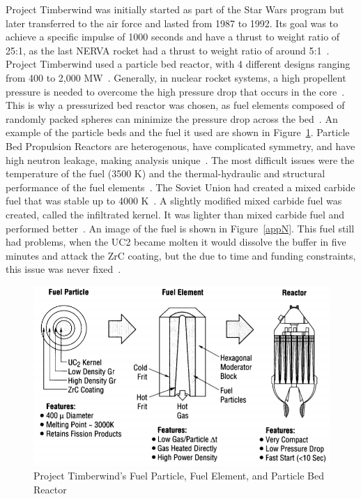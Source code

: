 \documentclass{article}
\begin{document}
Project Timberwind was initially started as part of the Star Wars program but later transferred to the air force and lasted from 1987 to 1992. Its goal was to achieve a specific impulse of 1000 seconds and have a thrust to weight ratio of 25:1, as the last NERVA rocket had a thrust to weight ratio of around 5:1~\cite{haslett1995space}. Project Timberwind used a particle bed reactor, with 4 different designs ranging from 400 to 2,000 MW~\cite{ludewig1996design}. Generally, in nuclear rocket systems, a high propellent pressure is needed to overcome the high pressure drop that occurs in the core~\cite{ludewig1996design}. This is why a pressurized bed reactor was chosen, as fuel elements composed of randomly packed spheres can minimize the pressure drop across the bed~\cite{ludewig1996design}. An example of the particle beds and the fuel it used are shown in Figure~\ref{appM}. Particle Bed Propulsion Reactors are heterogenous, have complicated symmetry, and have high neutron leakage, making analysis unique~\cite{ludewig1996design}. The most difficult issues were the temperature of the fuel (3500 K) and the thermal-hydraulic and structural performance of the fuel elements~\cite{haslett1995space}. The Soviet Union had created a mixed carbide fuel that was stable up to 4000 K~\cite{haslett1995space}. A slightly modified mixed carbide fuel was created, called the infiltrated kernel. It was lighter than mixed carbide fuel and performed better~\cite{haslett1995space}. An image of the fuel is shown in Figure~\ref{appN}. This fuel still had problems, when the UC2 became molten it would dissolve the buffer in five minutes and attack the ZrC coating, but the due to time and funding constraints, this issue was never fixed~\cite{haslett1995space}.


\begin{figure}[]
	\centering
	\includegraphics[height=0.45\textheight]{fig/appM}
	\caption[Project Timberwind's Fuel Particle, Fuel Element, and Particle Bed Reactor]{Project Timberwind's Fuel Particle, Fuel Element, and Particle Bed Reactor~\cite{ludewig1996design}}
	\label{appM}
\end{figure}
\end{document}

